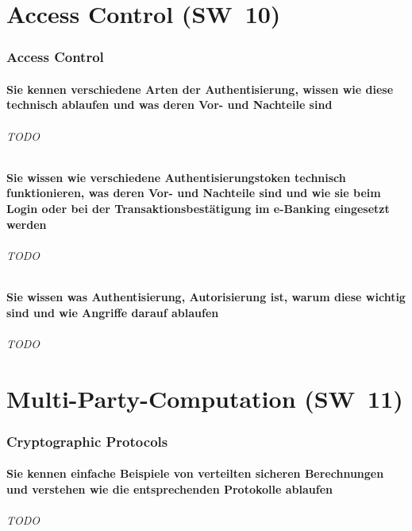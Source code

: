\documentclass[10pt,a4paper]{article}
\begin{document}
\part{Access Control (SW~10)}
\section{Access Control}
\subsection*{Sie kennen verschiedene Arten der Authentisierung, wissen wie diese technisch ablaufen und was deren Vor- und Nachteile sind}
\paragraph*{TODO}
\subsection*{Sie wissen wie verschiedene Authentisierungstoken technisch funktionieren, was deren Vor- und Nachteile sind und wie sie beim Login oder bei der Transaktionsbestätigung im e-Banking eingesetzt werden}
\paragraph*{TODO}
\subsection*{Sie wissen was Authentisierung, Autorisierung ist, warum diese wichtig sind und wie Angriffe darauf ablaufen}
\paragraph*{TODO}


\part{Multi-Party-Computation (SW~11)}
\section{Cryptographic Protocols}
\subsection*{Sie kennen einfache Beispiele von verteilten sicheren Berechnungen und verstehen wie die entsprechenden Protokolle ablaufen}
\paragraph*{TODO}
\end{document}
